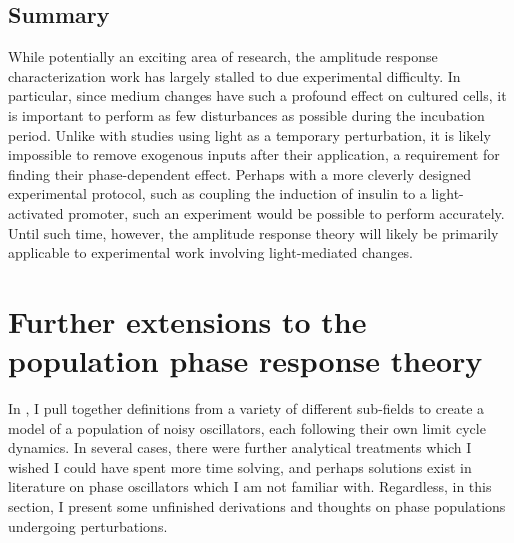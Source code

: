 \subsection{Summary}

While potentially an exciting area of research, the amplitude response characterization work has largely stalled to due experimental difficulty.
In particular, since medium changes have such a profound effect on cultured cells, it is important to perform as few disturbances as possible during the incubation period.
Unlike with studies using light as a temporary perturbation, it is likely impossible to remove exogenous inputs after their application, a requirement for finding their phase-dependent effect.
Perhaps with a more cleverly designed experimental protocol, such as coupling the induction of insulin to a light-activated promoter, such an experiment would be possible to perform accurately.
Until such time, however, the amplitude response theory will likely be primarily applicable to experimental work involving light-mediated changes.


\section{Further extensions to the population phase response theory}

In , I pull together definitions from a variety of different sub-fields to create a model of a population of noisy oscillators, each following their own limit cycle dynamics. 
In several cases, there were further analytical treatments which I wished I could have spent more time solving, and perhaps solutions exist in literature on phase oscillators which I am not familiar with.
Regardless, in this section, I present some unfinished derivations and thoughts on phase populations undergoing perturbations.

